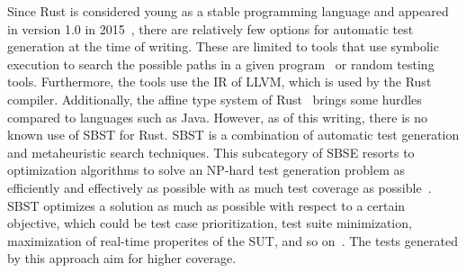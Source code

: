 \documentclass{article}
\begin{document}

Since Rust is considered young as a stable programming language and appeared in version 1.0 in 2015~\cite{Rust10}, there are relatively few options for automatic test generation at the time of writing. These are limited to tools that use symbolic execution to search the possible paths in a given program~\cite{cadar2008klee} or random testing tools. Furthermore, the tools use the \ac{IR} of LLVM, which is used by the Rust compiler. Additionally, the affine type system of Rust~\cite{Anderson2016} brings some hurdles compared to languages such as Java. However, as of this writing, there is no known use of \ac{SBST} for Rust. \ac{SBST} is a combination of automatic test generation and metaheuristic search techniques. This subcategory of SBSE resorts to optimization algorithms to solve an NP-hard test generation problem as efficiently and effectively as possible with as much test coverage as possible~\cite{Khari2019}. \ac{SBST} optimizes a solution as much as possible with respect to a certain objective, which could be test case prioritization, test suite minimization, maximization of real-time properites of the SUT, and so on~\cite{Khari2019}. The tests generated by this approach aim for higher coverage. 
\end{document}
